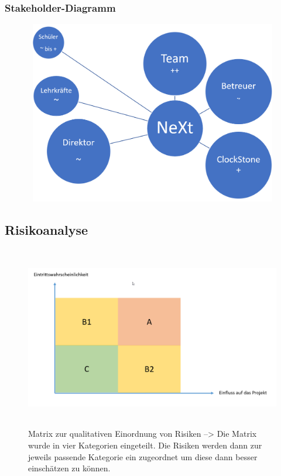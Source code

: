 \subsubsection{Stakeholder-Diagramm}
\begin{figure}[H]
	\centering
	\label{Stakeholder-Diagramm}

	\includegraphics[width=16cm,height=8cm]{images/Projektumfeldanalyse.png}
\end{figure}


\subsection{Risikoanalyse}
\begin{figure}[H]
	\centering
	\includegraphics[width=16cm,height=8cm]{images/Risiko-Matrix.png}
	\caption{Matrix zur qualitativen Einordnung von Risiken --> Die Matrix wurde in vier Kategorien eingeteilt. Die Risiken werden dann zur jeweils passende Kategorie ein zugeordnet um diese dann besser einschätzen zu können.\cite[S. 141 -142]{SystemplanungundProjektmanagement-Lehrbuch}}
\end{figure}

